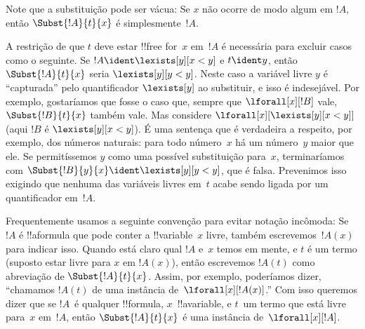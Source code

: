 \documentclass[../../../include/open-logic-section]{subfiles}
\begin{document}
\begin{explain}
Note que a substituição pode ser vácua: Se $x$ não ocorre de modo algum em $!A$,
então $\Subst{!A}{t}{x}$ é simplesmente~$!A$.

A restrição de que $t$ deve estar !!{free for}~$x$ em~$!A$ é necessária para
excluir casos como o seguinte. Se $!A \ident \lexists[y][x < y]$
e $t \ident y$, então $\Subst{!A}{t}{x}$ seria $\lexists[y][y <
  y]$. Neste caso a variável livre $y$ é ``capturada'' pelo
quantificador $\lexists[y]$ ao substituir, e isso é indesejável.
Por exemplo, gostaríamos que fosse o caso que, sempre que
$\lforall[x][!B]$ vale, $\Subst{!B}{t}{x}$ também vale. Mas considere
$\lforall[x][\lexists[y][x < y]]$ (aqui $!B$ é $\lexists[y][x <
  y]$). É uma sentença que é verdadeira a respeito, por exemplo, dos números naturais:
para todo número~$x$ há um número~$y$ maior que ele. Se
permitíssemos $y$ como uma possível substituição para~$x$, terminaríamos com
$\Subst{!B}{y}{x} \ident \lexists[y][y < y]$, que é falsa. 
Prevenimos isso exigindo que nenhuma das variáveis livres em~$t$
acabe sendo ligada por um quantificador em~$!A$.
\end{explain}

Frequentemente usamos a seguinte convenção para evitar notação incômoda: Se
$!A$ é !!a{formula} que pode conter a !!{variable}~$x$ livre, também
escrevemos~$!A(x)$ para indicar isso. Quando está claro qual $!A$
e~$x$ temos em mente, e $t$ é um termo (suposto estar livre para $x$
em $!A(x)$), então escrevemos $!A(t)$ como abreviação de $\Subst{!A}{t}{x}$. Assim,
por exemplo, poderíamos dizer, ``chamamos $!A(t)$ de uma instância
de~$\lforall[x][!A(x)]$.'' Com isso queremos dizer que se $!A$~é qualquer
!!{formula}, $x$~!!a{variable}, e $t$~um termo que está livre para~$x$
em~$!A$, então $\Subst{!A}{t}{x}$ é uma instância de~$\lforall[x][!A]$.
\end{document}
